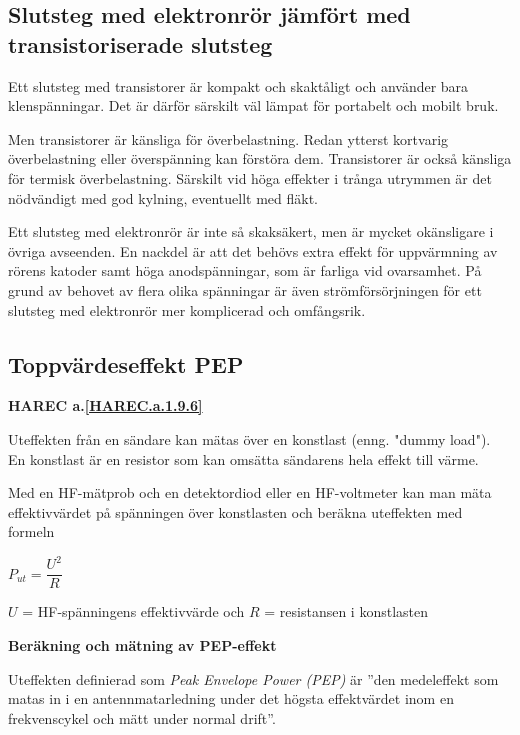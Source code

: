 \subsection{Slutsteg med elektronrör jämfört med transistoriserade slutsteg}

Ett slutsteg med transistorer är kompakt och skaktåligt och använder
bara klenspänningar.
Det är därför särskilt väl lämpat för portabelt och mobilt bruk.

Men transistorer är känsliga för överbelastning.
Redan ytterst kortvarig överbelastning eller överspänning kan förstöra dem.
Transistorer är också känsliga för termisk överbelastning.
Särskilt vid höga effekter i trånga utrymmen är det nödvändigt med god kylning,
eventuellt med fläkt.

Ett slutsteg med elektronrör är inte så skaksäkert, men är mycket okänsligare
i övriga avseenden.
En nackdel är att det behövs extra effekt för uppvärmning av rörens katoder
samt höga anodspänningar, som är farliga vid ovarsamhet.
På grund av behovet av flera olika spänningar är även strömförsörjningen för
ett slutsteg med elektronrör mer komplicerad och omfångsrik.

\subsection{Toppvärdeseffekt PEP}
\textbf{HAREC a.\ref{HAREC.a.1.9.6}\label{myHAREC.a.1.9.6}}
\label{PEP-effekt}

Uteffekten från en sändare kan mätas över en konstlast (enng. "dummy load").
En konstlast är en resistor som kan omsätta sändarens hela effekt till värme.

Med en HF-mätprob och en detektordiod eller en HF-voltmeter kan man mäta
effektivvärdet på spänningen över konstlasten och beräkna uteffekten med
formeln

\(P_{ut} = \dfrac{U^2}{R}\)

\(U\) = HF-spänningens effektivvärde och 
\(R\) = resistansen i konstlasten

\textbf{Beräkning och mätning av PEP-effekt}

Uteffekten definierad som \emph{Peak Envelope Power (PEP)} \cite[1.157]{ITU-RR}
är ''den medeleffekt som matas in i en antennmatarledning under det högsta
effektvärdet inom en frekvenscykel och mätt under normal drift''.


